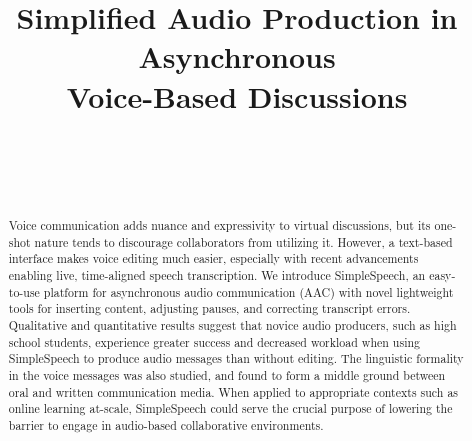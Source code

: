 \documentclass{sigchi}
\begin{document}
\title{Simplified Audio Production in Asynchronous \\ Voice-Based Discussions}

\author{%
  \\
  \\
  \\
}

\maketitle

\begin{abstract}
Voice communication adds nuance and expressivity to virtual discussions, but its one-shot nature tends to discourage collaborators from utilizing it.
However, a text-based interface makes voice editing much easier, especially with recent advancements enabling live, time-aligned speech transcription.
We introduce SimpleSpeech, an easy-to-use platform for asynchronous audio communication (AAC) with novel lightweight tools for inserting content, adjusting pauses, and correcting transcript errors.
Qualitative and quantitative results suggest that novice audio producers, such as high school students, experience greater success and decreased workload when using SimpleSpeech to produce audio messages than without editing.
The linguistic formality in the voice messages was also studied, and found to form a middle ground between oral and written communication media.
When applied to appropriate contexts such as online learning at-scale, SimpleSpeech could serve the crucial purpose of lowering the barrier to engage in audio-based collaborative environments.
\end{abstract}

\end{document}
